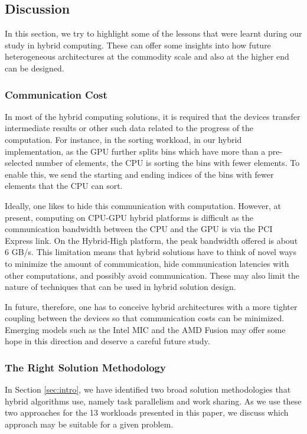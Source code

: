 \documentclass[11pt]{article}
\begin{document}
\subsection{Discussion}

In this section, we try to highlight some of the lessons that were
learnt during our study in hybrid computing. These can offer some
insights into how future heterogeneous architectures at the commodity 
scale and also at the higher end can be designed. 


\subsubsection{Communication Cost}
In most of the hybrid computing solutions, it is required that the
devices transfer intermediate results or other such data related to the
progress of the computation. For instance, in the sorting workload, in
our hybrid implementation,  as the GPU further splits bins which have
more than a pre-selected number of elements, the CPU is sorting the bins
with fewer elements. To enable this, we send the starting and ending
indices of the bins with fewer elements that the CPU can sort.

Ideally, one likes to hide this communication with computation. However,
at present, computing on CPU-GPU hybrid platforms is difficult as the
communication bandwidth between the CPU and the GPU is via the PCI
Express link. On the Hybrid-High
platform, the peak bandwidth offered is about 6 GB/s. This limitation
means that hybrid solutions have to think of novel ways to minimize the
amount of communication, hide communication latencies with other
computations, and possibly avoid communication.  These may also limit the
nature of techniques that can be used in hybrid solution design. 

In future, therefore, one has to conceive hybrid architectures with a
more tighter coupling between the devices so that communication costs can
be minimized. Emerging models such as the Intel MIC and the AMD Fusion 
may offer some hope in this direction and deserve a careful future study.

\subsubsection{The Right Solution Methodology}
In Section \ref{sec:intro}, we have identified two broad solution
methodologies that hybrid algorithms use, namely task parallelism and
work sharing. As we use these two approaches for the 13 workloads
presented in this paper, we discuss which approach may be suitable for a  given
problem. 
\end{document}
